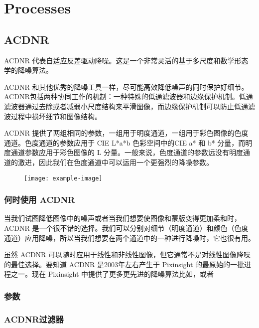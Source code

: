 \chapter{Processes}

\section{ACDNR}

ACDNR 代表自适应反差驱动降噪。这是一个非常灵活的基于多尺度和数学形态学的降噪算法。

ACDNR 和其他优秀的降噪工具一样，尽可能高效降低噪声的同时保护好细节。ACDNR包括两种协同工作的机制：一种特殊的低通滤波器和边缘保护机制。低通滤波器通过去除或者减弱小尺度结构来平滑图像，而边缘保护机制可以防止低通滤波过程中损坏细节和图像结构。

ACDNR 提供了两组相同的参数，一组用于明度通道，一组用于彩色图像的色度通道。色度通道的参数应用于 CIE L*a*b 色彩空间中的CIE a* 和 b* 分量，而明度通道参数应用于彩色图像的 L 分量。一般来说，色度通道的参数远没有明度通道的激进，因此我们在色度通道中可以运用一个更强烈的降噪参数。

\begin{figure}[h]
  \centering
  \texttt{[image: example-image]}
\end{figure}


\subsection{何时使用 ACDNR}

当我们试图降低图像中的噪声或者当我们想要使图像和蒙版变得更加柔和时，ACDNR 是一个很不错的选择。我们可以分别对细节（明度通道）和颜色（色度通道）应用降噪，所以当我们想要在两个通道中的一种进行降噪时，它也很有用。

虽然 ACDNR 可以随时应用于线性和非线性图像，但它通常不是对线性图像降噪的最佳选择。要知道 ACDNR 是2003年左右产生于 Pixinsight 的最原始的一批进程之一。现在 Pixinsight 中提供了更多更先进的降噪算法比如，或者 


\subsection{参数}


\subsection{ACDNR过滤器}

